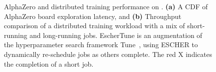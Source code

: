 \begin{figure}[t]
  \caption{AlphaZero and distributed training performance on \name{}. 
  \textbf{(a)} A CDF of AlphaZero board exploration latency, and
  \textbf{(b)} Throughput comparison of a distributed training workload with a mix of short-running and long-running jobs. EscherTune is an augmentation of the hyperparameter search framework Tune~\cite{liaw2018tune}, using ESCHER to dynamically re-schedule jobs as others complete. %
  The red X indicates the completion of a short job. %
  }
  \label{fig:alphazerolatencyfigure}
  \vspace{-2mm}
  \end{figure}

